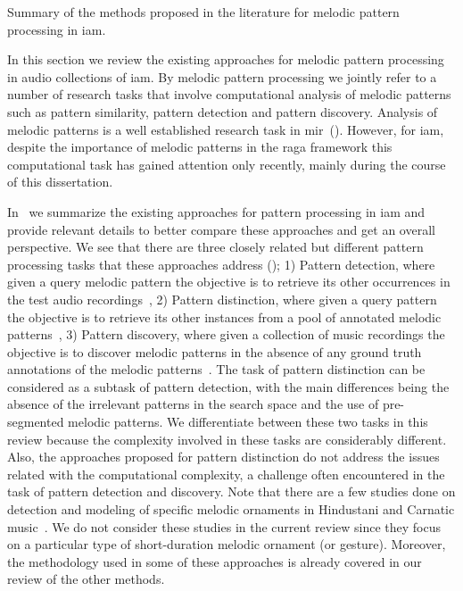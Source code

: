 \begin{table}
\begin{threeparttable}
\begin{tablenotes}
		\end{tablenotes}
		\caption[Summary of the melodic pattern processing methods for \gls{iam}]{Summary of the methods proposed in the literature for melodic pattern processing in \gls{iam}. }
		\label{tab:pattern_processing_iam}
	\end{threeparttable}
\end{table}

In this section we review the existing approaches for melodic pattern processing in audio collections of \gls{iam}. By melodic pattern processing we jointly refer to a number of research tasks that involve computational analysis of melodic patterns such as pattern similarity, pattern detection and pattern discovery. Analysis of melodic patterns is a well established research task in \gls{mir}~(). However, for \gls{iam}, despite the importance of melodic patterns in the \gls{raga} framework this computational task has gained attention only recently, mainly during the course of this dissertation. 

In~ we summarize the existing approaches for pattern processing in \gls{iam} and provide relevant details to better compare these approaches and get an overall perspective. We see that there are three closely related but different pattern processing tasks that these approaches address (); 1) Pattern detection, where given a query melodic pattern the objective is to retrieve its other occurrences in the test audio recordings~\citep{Ross2012,Ross2012b,Ishwar2013,dutta2014modified,ganguli2015efficient}, 2) Pattern distinction, where given a query pattern the objective is to retrieve its other instances from a pool of annotated melodic patterns~\citep{ishwar2012motivic,rao2013distinguishing,Rao2014}, 3) Pattern discovery, where given a collection of music recordings the objective is to discover melodic patterns in the absence of any ground truth annotations of the melodic patterns~\citep{Dutta2014}. The task of pattern distinction can be considered as a subtask of pattern detection, with the main differences being the absence of the irrelevant patterns in the search space and the use of pre-segmented melodic patterns. We differentiate between these two tasks in this review because the complexity involved in these tasks are considerably different. Also, the approaches proposed for pattern distinction do not address the issues related with the computational complexity, a challenge often encountered in the task of pattern detection and discovery. Note that there are a few studies done on detection and modeling of specific melodic ornaments in Hindustani and Carnatic music~\citep{Subramanian2012,Datta2007,narayan2014detection,pratyush_2010}. We do not consider these studies in the current review since they focus on a particular type of short-duration melodic ornament (or gesture). Moreover, the methodology used in some of these approaches is already covered in our review of the other methods.


